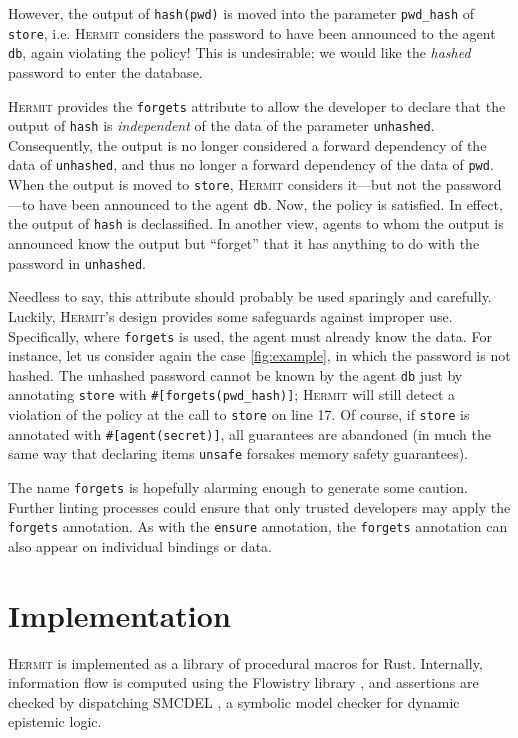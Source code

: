 \documentclass[letterpaper,twocolumn,10pt]{article}
\newcommand{\Hermit}{\textsc{Hermit}}
\begin{document}
However, the output of \lstinline{hash(pwd)} is moved into the parameter \lstinline{pwd_hash} of
\lstinline{store}, i.e. \Hermit{} considers the password to have been announced to the agent
\lstinline{db}, again violating the policy! This is undesirable; we would like the \emph{hashed}
password to enter the database.

\Hermit{} provides the \lstinline{forgets} attribute to allow the developer to declare that the
output of \lstinline{hash} is \emph{independent} of the data of the parameter \lstinline{unhashed}.
Consequently, the output is no longer considered a forward dependency of the data of
\lstinline{unhashed}, and thus no longer a forward dependency of the data of \lstinline{pwd}. When
the output is moved to \lstinline{store}, \Hermit{} considers it---but not the password---to have
been announced to the agent \lstinline{db}. Now, the policy is satisfied. In effect, the output of
\lstinline{hash} is declassified. In another view, agents to whom the output is announced know the
output but ``forget'' that it has anything to do with the password in \lstinline{unhashed}.

Needless to say, this attribute should probably be used sparingly and carefully. Luckily, \Hermit's
design provides some safeguards against improper use. Specifically, where \lstinline{forgets} is
used, the agent must already know the data. For instance, let us consider again the case
\cref{fig:example}, in which the password is not hashed. The unhashed password cannot be known by
the agent \lstinline{db} just by annotating \lstinline{store} with \lstinline{#[forgets(pwd_hash)]};
\Hermit{} will still detect a violation of the policy at the call to \lstinline{store} on line 17.
Of course, if \lstinline{store} is annotated with \lstinline{#[agent(secret)]}, all guarantees are
abandoned (in much the same way that declaring items \lstinline{unsafe} forsakes memory safety
guarantees).

The name \lstinline{forgets} is hopefully alarming enough to generate some caution. Further linting
processes could ensure that only trusted developers may apply the \lstinline{forgets} annotation. As
with the \lstinline{ensure} annotation, the \lstinline{forgets} annotation can also appear on
individual bindings or data.

\section{Implementation}

\Hermit{} is implemented as a library of procedural macros for Rust. Internally, information flow is
computed using the Flowistry library \cite{crichton_2022a}, and assertions are checked by
dispatching SMCDEL \cite{gattinger_2018a}, a symbolic model checker for dynamic epistemic logic.
\end{document}
